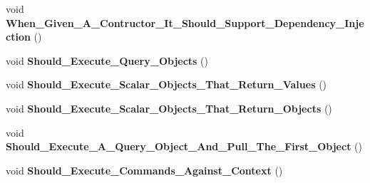 \begin{DoxyCompactItemize}
\item 
\hypertarget{class_framework_extension_1_1_entity_framework_1_1_tests_1_1_unit_tests_1_1_given___a___generic___repository_ac152ff77e79bc18befb40f2f38bca218}{void {\bfseries When\-\_\-\-Given\-\_\-\-A\-\_\-\-Contructor\-\_\-\-It\-\_\-\-Should\-\_\-\-Support\-\_\-\-Dependency\-\_\-\-Injection} ()}\label{class_framework_extension_1_1_entity_framework_1_1_tests_1_1_unit_tests_1_1_given___a___generic___repository_ac152ff77e79bc18befb40f2f38bca218}

\item 
\hypertarget{class_framework_extension_1_1_entity_framework_1_1_tests_1_1_unit_tests_1_1_given___a___generic___repository_aa239cd9107eba961105c741064b00d3d}{void {\bfseries Should\-\_\-\-Execute\-\_\-\-Query\-\_\-\-Objects} ()}\label{class_framework_extension_1_1_entity_framework_1_1_tests_1_1_unit_tests_1_1_given___a___generic___repository_aa239cd9107eba961105c741064b00d3d}

\item 
\hypertarget{class_framework_extension_1_1_entity_framework_1_1_tests_1_1_unit_tests_1_1_given___a___generic___repository_ab08819451bb3dc341cd7da033e7d7b9d}{void {\bfseries Should\-\_\-\-Execute\-\_\-\-Scalar\-\_\-\-Objects\-\_\-\-That\-\_\-\-Return\-\_\-\-Values} ()}\label{class_framework_extension_1_1_entity_framework_1_1_tests_1_1_unit_tests_1_1_given___a___generic___repository_ab08819451bb3dc341cd7da033e7d7b9d}

\item 
\hypertarget{class_framework_extension_1_1_entity_framework_1_1_tests_1_1_unit_tests_1_1_given___a___generic___repository_aefd92e774733e5b6aacd062b72588675}{void {\bfseries Should\-\_\-\-Execute\-\_\-\-Scalar\-\_\-\-Objects\-\_\-\-That\-\_\-\-Return\-\_\-\-Objects} ()}\label{class_framework_extension_1_1_entity_framework_1_1_tests_1_1_unit_tests_1_1_given___a___generic___repository_aefd92e774733e5b6aacd062b72588675}

\item 
\hypertarget{class_framework_extension_1_1_entity_framework_1_1_tests_1_1_unit_tests_1_1_given___a___generic___repository_a74d111be27574908b2c70fc660ec7335}{void {\bfseries Should\-\_\-\-Execute\-\_\-\-A\-\_\-\-Query\-\_\-\-Object\-\_\-\-And\-\_\-\-Pull\-\_\-\-The\-\_\-\-First\-\_\-\-Object} ()}\label{class_framework_extension_1_1_entity_framework_1_1_tests_1_1_unit_tests_1_1_given___a___generic___repository_a74d111be27574908b2c70fc660ec7335}

\item 
\hypertarget{class_framework_extension_1_1_entity_framework_1_1_tests_1_1_unit_tests_1_1_given___a___generic___repository_a28a89885537c7eda8d34a63da535b213}{void {\bfseries Should\-\_\-\-Execute\-\_\-\-Commands\-\_\-\-Against\-\_\-\-Context} ()}\label{class_framework_extension_1_1_entity_framework_1_1_tests_1_1_unit_tests_1_1_given___a___generic___repository_a28a89885537c7eda8d34a63da535b213}

\end{DoxyCompactItemize}
